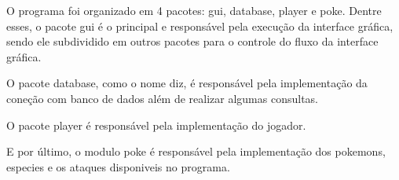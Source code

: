 \documentclass[12pt]{article}
\begin{document}
O programa foi organizado em 4 pacotes: gui, database, player e poke. Dentre esses, o pacote gui é o principal e responsável pela execução da interface gráfica, sendo ele subdividido em outros pacotes para o controle do fluxo da interface gráfica.


O pacote database, como o nome diz, é responsável pela implementação da coneção com banco de dados além de realizar algumas consultas.


O pacote player é responsável pela implementação do jogador.


E por último, o modulo poke é responsável pela implementação dos pokemons, especies e os ataques disponiveis no programa.
\end{document}

